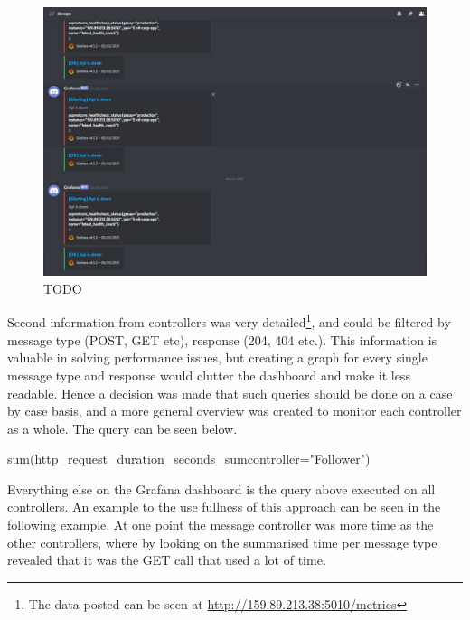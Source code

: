 \documentclass[report/main.tex]{subfiles}
\begin{document}
            \begin{figure}[H]
                \centering
                \includegraphics[width=\textwidth]{report/images/Grafana Discord Alert.jpg}
                \caption{TODO}
                \label{fig:grafana_discord_alert}
            \end{figure}
            
            Second information from controllers was very detailed\footnote{The data posted can be seen at \hyperlink{http://159.89.213.38:5010/metrics}{http://159.89.213.38:5010/metrics}}, and could be filtered by message type (POST, GET etc), response (204, 404 etc.). This information is valuable in solving performance issues, but creating a graph for every single message type and response would clutter the dashboard and make it less readable. Hence a decision was made that such queries should be done on a case by case basis, and a more general overview was created to monitor each controller as a whole. The query can be seen below.
                
            \begin{center}
                sum(http\_request\_duration\_seconds\_sum{controller="Follower"})
            \end{center}
                
            Everything else on the Grafana dashboard is the query above executed on all controllers. An example to the use fullness of this approach can be seen in the following example. At one point the message controller was more time as the other controllers, where by looking on the summarised time per message type revealed that it was the GET call that used a lot of time.
                
\end{document}
